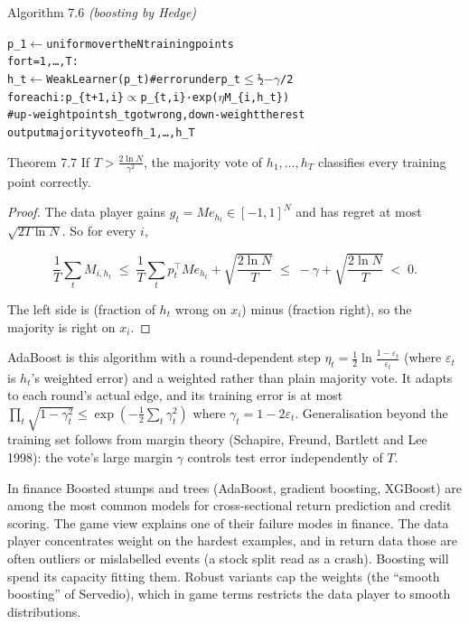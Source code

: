 \documentclass[11pt,a4paper,openany]{book}
\newcommand{\eps}{\varepsilon}
\newenvironment{algo}{\par\smallskip\begingroup\footnotesize\begin{alltt}}{\end{alltt}\endgroup\smallskip}
\begin{document}
\begin{balg}{Algorithm 7.6 \emph{(boosting by Hedge)}}
\begin{algo}
p\_1 \ensuremath{\leftarrow} uniform over the N training points
for t = 1, …, T:
    h\_t \ensuremath{\leftarrow} WeakLearner(p\_t)          \# error under p\_t \ensuremath{\le} ½ \ensuremath{-} \ensuremath{\gamma}/2
    for each i:  p\_\{t+1,i\} \ensuremath{\propto} p\_\{t,i\} · exp(\ensuremath{\eta} M\_\{i,h\_t\})
                 \# up-weight points h\_t got wrong, down-weight the rest
output majority vote of h\_1, …, h\_T
\end{algo}
\end{balg}

\begin{bthm}{Theorem 7.7}
If $T>\frac{2\ln N}{\gamma^2}$, the majority vote of $h_1,\dots,h_T$ classifies every training point correctly.
\end{bthm}

\begin{proof}
The data player gains $g_t=Me_{h_t}\in[-1,1]^N$ and has regret at most $\sqrt{2T\ln N}$. So for every $i$,

\[\frac1T\sum_tM_{i,h_t}\;\le\;\frac1T\sum_tp_t^\top Me_{h_t}+\sqrt{\frac{2\ln N}{T}}\;\le\;-\gamma+\sqrt{\frac{2\ln N}{T}}\;<\;0.\]

The left side is (fraction of $h_t$ wrong on $x_i$) minus (fraction right), so the majority is right on $x_i$.
\end{proof}

AdaBoost is this algorithm with a round-dependent step $\eta_t=\frac12\ln\frac{1-\eps_t}{\eps_t}$ (where $\eps_t$ is $h_t$'s weighted error) and a weighted rather than plain majority vote. It adapts to each round's actual edge, and its training error is at most $\prod_t\sqrt{1-\gamma_t^2}\le\exp(-\frac12\sum_t\gamma_t^2)$ where $\gamma_t=1-2\eps_t$. Generalisation beyond the training set follows from margin theory (Schapire, Freund, Bartlett and Lee 1998): the vote's large margin $\gamma$ controls test error independently of $T$.

\begin{bfin}{In finance}
Boosted stumps and trees (AdaBoost, gradient boosting, XGBoost) are among the most common models for cross-sectional return prediction and credit scoring. The game view explains one of their failure modes in finance. The data player concentrates weight on the hardest examples, and in return data those are often outliers or mislabelled events (a stock split read as a crash). Boosting will spend its capacity fitting them. Robust variants cap the weights (the ``smooth boosting'' of Servedio), which in game terms restricts the data player to smooth distributions.
\end{bfin}
\end{document}
